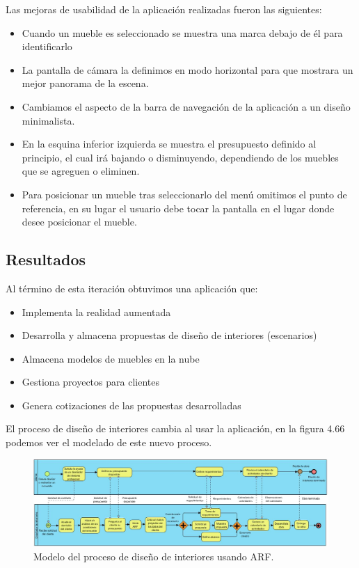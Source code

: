 Las mejoras de usabilidad de la aplicación realizadas fueron las siguientes:
\begin{itemize}
	\item Cuando un mueble es seleccionado se muestra una marca debajo de él para identificarlo
	\item La pantalla de cámara la definimos en modo horizontal para que mostrara un mejor panorama de la escena.
	\item Cambiamos el aspecto de la barra de navegación de la aplicación a un diseño minimalista.
	\item En la esquina inferior izquierda se muestra el presupuesto definido al principio, el cual irá bajando o disminuyendo, dependiendo de los muebles que se agreguen o eliminen.
	\item Para posicionar un mueble tras seleccionarlo del menú omitimos el punto de referencia, en su lugar el usuario debe tocar la pantalla en el lugar donde desee posicionar el mueble.
\end{itemize}

\subsection{Resultados}
Al término de esta iteración obtuvimos una aplicación que:
\begin{itemize}
	\item Implementa la realidad aumentada
	\item Desarrolla y almacena propuestas de diseño de interiores (escenarios)
	\item Almacena modelos de muebles en la nube
	\item Gestiona proyectos para clientes
	\item Genera cotizaciones de las propuestas desarrolladas
\end{itemize}

El proceso de diseño de interiores cambia al usar la aplicación, en la figura 4.66 podemos ver el modelado de este nuevo proceso.
\begin{figure}[!htbp]
	\centering
	\includegraphics[width=20cm,angle=270,origin=c]{imagenes/desarrollo/diagramas/NPMN_FINAL_ID.jpg}
	\caption{Modelo del proceso de diseño de interiores usando ARF.}
	\label{fig:bpmnarf}
\end{figure}
\clearpage